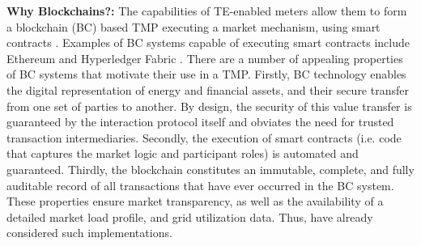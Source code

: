\documentclass[sigplan]{acmart}
\newcommand{\Karla}[1]{\todo[color=green!50, linecolor=black!50]{\textbf{Karla}: #1}}
\begin{document}




\textbf{Why Blockchains?:} The capabilities of TE-enabled meters allow them to form a blockchain (BC) based TMP executing a market mechanism, using smart contracts \cite{Szabo97}. Examples of BC systems capable of executing smart contracts include Ethereum \cite{Buterin2013} and Hyperledger Fabric \cite{HyperledgerFabric16}.
There are a number of appealing properties of BC systems that motivate their use in a TMP. Firstly, BC technology enables the digital representation of energy and financial assets, and their secure transfer from one set of parties to another. By design, the security of this value transfer is guaranteed by the interaction protocol itself and obviates the need for trusted transaction intermediaries. Secondly, the execution of smart contracts (i.e. code that captures the market logic and participant roles) is automated and guaranteed.
Thirdly, the blockchain constitutes an immutable, complete, and fully auditable record of all transactions that have ever occurred in the BC system. These properties ensure market transparency, as well as the availability of a detailed market load profile, and grid utilization data. Thus, \cite{PowerLedger,TenneT,Lo3Patent} have already considered such implementations.
\end{document}
